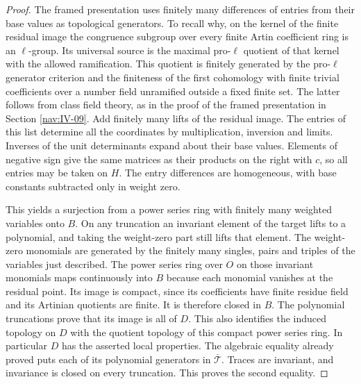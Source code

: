 \documentclass[a4paper,11pt]{article}
\theoremstyle{definition}
\theoremstyle{remark}
\numberwithin{equation}{section}
\begin{document}
\begin{proof}
The framed presentation uses finitely many differences of entries
from their base values as topological generators. To recall why,
on the kernel of the finite residual image the congruence
subgroup over every finite Artin coefficient ring is an
\(\ell\)-group. Its universal source is the maximal pro-\(\ell\)
quotient of that kernel with the allowed ramification. This
quotient is finitely generated by the pro-\(\ell\) generator
criterion and the finiteness of the first cohomology with finite
trivial coefficients over a number field unramified outside a
fixed finite set. The latter follows from class field theory,
as in the proof of the framed presentation in Section \ref{nav:IV-09}. Add finitely many lifts of the
residual image. The entries of this list determine all the
coordinates by multiplication, inversion and limits. Inverses
of the unit determinants expand about their base values.
Elements of negative sign give the same matrices as their
products on the right with \(c\), so all entries may be taken
on \(H\). The entry differences are homogeneous, with
base constants subtracted only in weight zero.

This yields a surjection from a power series ring with finitely
many weighted variables onto \(B\). On any truncation an
invariant element of the target lifts to a polynomial, and
taking the weight-zero part still lifts that element. The
weight-zero monomials are generated by the finitely many
singles, pairs and triples of the variables just described.
The power series ring over \(O\) on those invariant monomials
maps continuously into \(B\) because each monomial vanishes
at the residual point. Its image is compact, since its
coefficients have finite residue field and its Artinian
quotients are finite. It is therefore closed in \(B\).
The polynomial truncations prove that its image is all of \(D\).
This also identifies the induced topology on \(D\) with the
quotient topology of this compact power series ring. In
particular \(D\) has the asserted local properties. The
algebraic equality already proved puts each of its polynomial
generators in \(\overline{\mathcal T}\). Traces are invariant,
and invariance is closed on every truncation. This proves the
second equality.
\end{proof}
\end{document}
